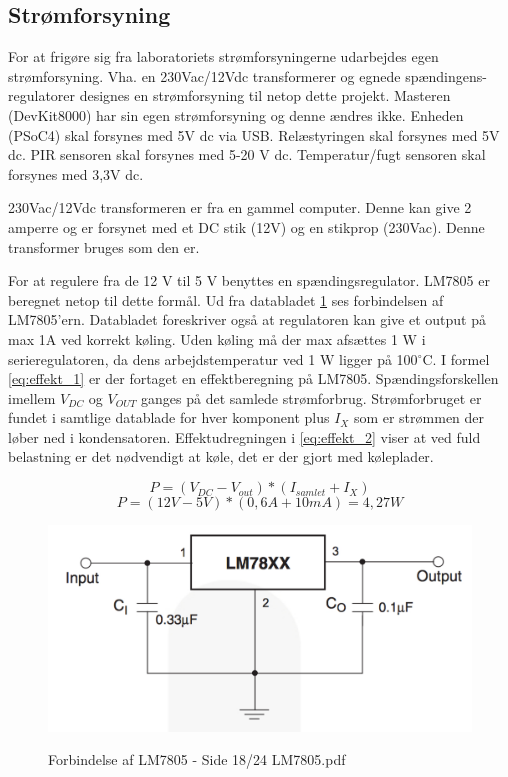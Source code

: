 \subsection{Strømforsyning}

For at frigøre sig fra laboratoriets strømforsyningerne udarbejdes egen strømforsyning. Vha. en 230Vac/12Vdc transformerer og egnede spændingens-regulatorer designes en strømforsyning til netop dette projekt. Masteren (DevKit8000) har sin egen strømforsyning og denne ændres ikke. Enheden (PSoC4) skal forsynes med 5V dc via USB. Relæstyringen skal forsynes med 5V dc. PIR sensoren skal forsynes med 5-20 V dc. Temperatur/fugt sensoren skal forsynes med 3,3V dc. 

230Vac/12Vdc transformeren er fra en gammel computer. Denne kan give 2 amperre og er forsynet med et DC stik (12V) og en stikprop (230Vac). Denne transformer bruges som den er. 

For at regulere fra de 12 V til 5 V benyttes en spændingsregulator. LM7805 er beregnet netop til dette formål. Ud fra databladet \ref{lab:LM7805} ses forbindelsen af LM7805'ern. Databladet foreskriver også at regulatoren kan give et output på max 1A ved korrekt køling.  
\newline
Uden køling må der max afsættes 1 W i serieregulatoren, da dens arbejdstemperatur ved 1 W ligger på 100$^{\circ}$C.  I formel \ref{eq:effekt_1} er der fortaget en effektberegning på LM7805. Spændingsforskellen imellem $V_{DC}$ og $V_{OUT}$ ganges på det samlede strømforbrug. Strømforbruget er fundet i samtlige datablade for hver komponent plus $I_X$ som er strømmen der løber ned i kondensatoren. Effektudregningen i \ref{eq:effekt_2} viser at ved fuld belastning er det nødvendigt at køle, det er der gjort med køleplader. 

\begin{equation} 
P = (V_{DC}-V_{out})*(I_{samlet}+I_X) 
\label{eq:effekt_1}
\end{equation}
\begin{equation} 
P = (12V - 5V)*(0,6 A +10 mA)= 4,27 W 
\label{eq:effekt_2}
\end{equation}

\begin{figure}[H] \centering
{\includegraphics[width=\textwidth]{filer/design/Billeder/LM7805_DATASHEET}}
\caption{Forbindelse af LM7805 - Side 18/24 LM7805.pdf}
\label{lab:LM7805}
\raggedright
\end{figure}

